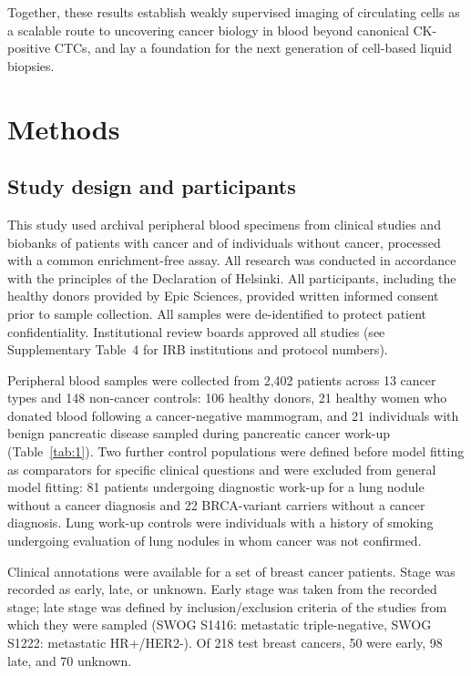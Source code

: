 \documentclass[11pt]{article}
\begin{document}
Together, these results establish weakly supervised imaging of circulating cells as a scalable route to uncovering cancer biology in blood beyond canonical CK-positive CTCs, and lay a foundation for the next generation of cell-based liquid biopsies.

\section*{Methods}

\subsection*{Study design and participants}

This study used archival peripheral blood specimens from clinical studies and biobanks of patients with cancer and of individuals without cancer, processed with a common enrichment-free assay. All research was conducted in accordance with the principles of the Declaration of Helsinki. All participants, including the healthy donors provided by Epic Sciences, provided written informed consent prior to sample collection. All samples were de-identified to protect patient confidentiality. Institutional review boards approved all studies (see Supplementary Table~4 for IRB institutions and protocol numbers).

Peripheral blood samples were collected from 2,402 patients across 13 cancer types and 148 non-cancer controls: 106 healthy donors, 21 healthy women who donated blood following a cancer-negative mammogram, and 21 individuals with benign pancreatic disease sampled during pancreatic cancer work-up (Table~\ref{tab:1}). Two further control populations were defined before model fitting as comparators for specific clinical questions and were excluded from general model fitting: 81 patients undergoing diagnostic work-up for a lung nodule without a cancer diagnosis and 22 BRCA-variant carriers without a cancer diagnosis. Lung work-up controls were individuals with a history of smoking undergoing evaluation of lung nodules in whom cancer was not confirmed.

Clinical annotations were available for a set of breast cancer patients. Stage was recorded as early, late, or unknown. Early stage was taken from the recorded stage; late stage was defined by inclusion/exclusion criteria of the studies from which they were sampled (SWOG S1416\cite{rodler2023}: metastatic triple-negative, SWOG S1222\cite{moore2022}: metastatic HR+/HER2-). Of 218 test breast cancers, 50 were early, 98 late, and 70 unknown.
\end{document}
